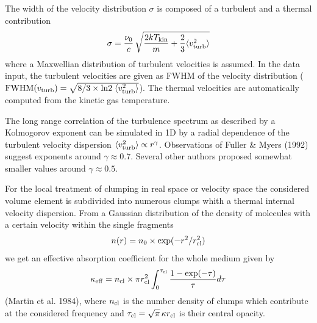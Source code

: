 The width of the velocity distribution $\sigma$ is composed of a 
turbulent and a thermal contribution
\begin{equation}
\sigma = {\nu_0 \over c} \,\sqrt{ {2kT_{\rm kin} \over m} + {2 \over 3} 
\langle v_{\rm turb}^2 \rangle}
\end{equation}
where a Maxwellian distribution of turbulent velocities is assumed. 
In the data input, the turbulent velocities are given as FWHM of the 
velocity distribution (${\rm FWHM}(v_{\rm turb})=\sqrt{8/3\times{\rm ln}2\;
\langle v_{\rm turb}^2 \rangle}$). The thermal velocities are automatically
computed from the kinetic gas temperature.

The long range correlation of the turbulence spectrum as described by
a Kolmogorov exponent can be simulated in 1D by a radial dependence
of the turbulent velocity dispersion $\langle v_{\rm turb}^2\rangle 
\propto r^\gamma$. Observations of Fuller \& Myers (1992) suggest 
exponents around $\gamma \approx 0.7$. Several other authors proposed
somewhat smaller values around $\gamma \approx 0.5$.

For the local treatment of clumping in real space or velocity space the
considered volume element is subdivided into numerous
clumps whith a thermal internal velocity dispersion.
From a Gaussian distribution of the density of molecules with a certain 
velocity within the single fragments
\begin{equation}
n(r)=n_0\times\exp(-r^2/r_{\rm cl}^2)
\end{equation}
we get an effective absorption coefficient for the whole medium
given by
\begin{equation}
\kappa_{\rm eff}=n_{\rm cl} \times \pi r_{\rm cl}^2 \int_0^{\tau_{\rm cl}}
{1-\exp(-\tau) \over \tau} d\tau
\end{equation}
(Martin et al. 1984),
where $n_{\rm cl}$ is the number density of clumps which contribute
at the considered frequency and $\tau_{\rm cl}=\sqrt{\pi}\,\kappa r_{\rm cl}$ is their central opacity.

